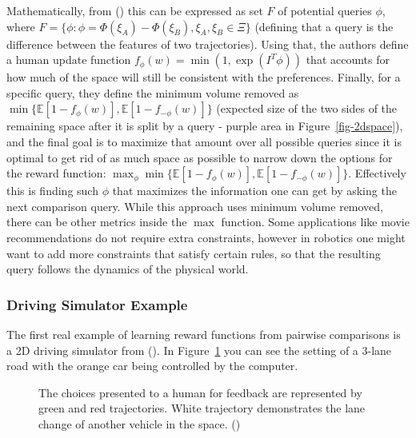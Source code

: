 \documentclass[
  letterpaper,
  numbers=noenddot,
  DIV=11]{scrreprt}
\theoremstyle{plain}
\theoremstyle{definition}
\theoremstyle{plain}
\theoremstyle{remark}
\begin{document}
Mathematically, from () this can be expressed as set \(F\) of potential queries \(\phi\),
where
\(F = \{\phi: \phi = \Phi(\xi_A) - \Phi(\xi_B), \xi_A, \xi_B \in \Xi\}\)
(defining that a query is the difference between the features of two
trajectories). Using that, the authors define a human update function
\(f_{\phi}(w) = \min(1, \exp(I^T\phi))\) that accounts for how much of
the space will still be consistent with the preferences. Finally, for a
specific query, they define the minimum volume removed as
\(\min\{\mathbb{E}[1 - f_{\phi}(w)], \mathbb{E}[1 - f_{-\phi}(w)]\}\)
(expected size of the two sides of the remaining space after it is split
by a query - purple area in Figure~\ref{fig-2dspace}), and the final
goal is to maximize that amount over all possible queries since it is
optimal to get rid of as much space as possible to narrow down the
options for the reward function:
\(\max_{\phi} \min\{ \mathbb{E}[1 - f_{\phi}(w)], \mathbb{E}[1 - f_{-\phi}(w)]\}\).
Effectively this is finding such \(\phi\) that maximizes the information
one can get by asking the next comparison query. While this approach
uses minimum volume removed, there can be other metrics inside the
\(\max\) function. Some applications like movie recommendations do not
require extra constraints, however in robotics one might want to add
more constraints that satisfy certain rules, so that the resulting query
follows the dynamics of the physical world.

\subsubsection*{Driving Simulator
Example}\label{driving-simulator-example}

The first real example of learning reward functions from pairwise
comparisons is a 2D driving simulator from
(). In
Figure~\ref{fig-car_direct} you can see the setting of a 3-lane road
with the orange car being controlled by the computer.

\begin{figure}


\caption{\label{fig-car_direct}The choices presented to a human for
feedback are represented by green and red trajectories. White trajectory
demonstrates the lane change of another vehicle in the space.
()}

\end{figure}%
\end{document}
